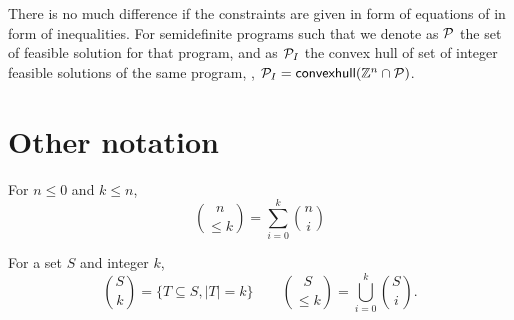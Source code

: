 \documentclass[a4paper,justified]{tufte-handout}
\begin{document}
There is no much difference if the constraints are given in form of
equations of in form of inequalities.  For semidefinite programs such
that we denote as $ \mathcal{P} $ the set of feasible solution for that
program, and as $ \mathcal{P}_{I} $ the convex hull of set of integer
feasible solutions of the same program, \ie, $ \mathcal{P}_{I} =
\mathsf{convexhull}(\mathbb{Z}^{n} \cap \mathcal{P}) $.


\section{Other notation}

For $ n\leq 0 $ and $ k\leq n $,
\begin{equation*}
  \binom{n}{\leq k} = \sum^{k}_{i=0}\binom{n}{i} 
\end{equation*}

For a set $ S $ and integer $k$,
\begin{equation*}
  \binom{S}{k}= \{ T \subseteq S, |T|=k  \} \qquad \binom{S}{\leq k} =
  \bigcup^{k}_{i=0} \binom{S}{i}.
\end{equation*}


% 
% 
\end{document}
